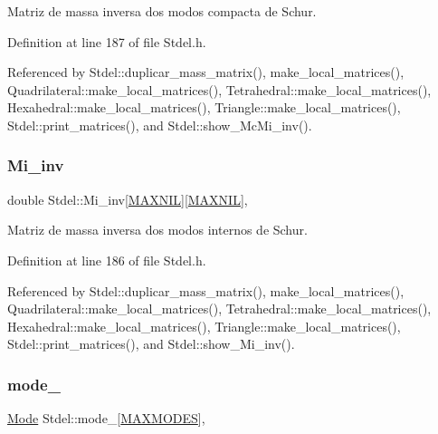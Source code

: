 Matriz de massa inversa dos modos compacta de Schur. 



Definition at line 187 of file Stdel.\+h.



Referenced by Stdel\+::duplicar\+\_\+mass\+\_\+matrix(), make\+\_\+local\+\_\+matrices(), Quadrilateral\+::make\+\_\+local\+\_\+matrices(), Tetrahedral\+::make\+\_\+local\+\_\+matrices(), Hexahedral\+::make\+\_\+local\+\_\+matrices(), Triangle\+::make\+\_\+local\+\_\+matrices(), Stdel\+::print\+\_\+matrices(), and Stdel\+::show\+\_\+\+Mc\+Mi\+\_\+inv().

\mbox{\label{classStdel_a53a9490d5a02a96473d96848bac3711a}} 
\subsubsection{\texorpdfstring{Mi\+\_\+inv}{Mi\_inv}}
{\footnotesize\ttfamily double Stdel\+::\+Mi\+\_\+inv\mbox{[}\hyperlink{MyOptions_8h_a463cdf068fb6289d1f81dac7e0f76ab5}{M\+A\+X\+N\+IL}\mbox{]}\mbox{[}\hyperlink{MyOptions_8h_a463cdf068fb6289d1f81dac7e0f76ab5}{M\+A\+X\+N\+IL}\mbox{]}\hspace{0.3cm}{\ttfamily [protected]}, {\ttfamily [inherited]}}



Matriz de massa inversa dos modos internos de Schur. 



Definition at line 186 of file Stdel.\+h.



Referenced by Stdel\+::duplicar\+\_\+mass\+\_\+matrix(), make\+\_\+local\+\_\+matrices(), Quadrilateral\+::make\+\_\+local\+\_\+matrices(), Tetrahedral\+::make\+\_\+local\+\_\+matrices(), Hexahedral\+::make\+\_\+local\+\_\+matrices(), Triangle\+::make\+\_\+local\+\_\+matrices(), Stdel\+::print\+\_\+matrices(), and Stdel\+::show\+\_\+\+Mi\+\_\+inv().

\mbox{\label{classStdel_a7a09cf048f14496813a914ca6afe7366}} 
\subsubsection{\texorpdfstring{mode\+\_\+}{mode\_}}
{\footnotesize\ttfamily \hyperlink{classMode}{Mode} Stdel\+::mode\+\_\+\mbox{[}\hyperlink{MyOptions_8h_aa75ccd382acf88cec3e9c8025c1f88b7}{M\+A\+X\+M\+O\+D\+ES}\mbox{]}\hspace{0.3cm}{\ttfamily [protected]}, {\ttfamily [inherited]}}



